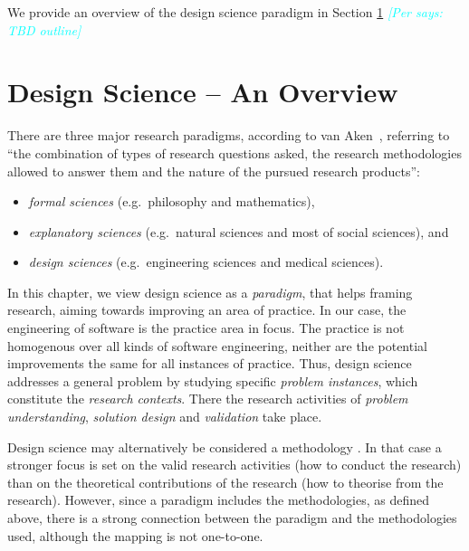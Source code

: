 \documentclass[graybox]{svmult}
\newcommand{\per}[1]{\textcolor{cyan}{{\it [Per says: #1]}}}
\newcommand{\per}[1]{}
\begin{document}
We provide an overview of the design science paradigm in Section \ref{sec:overview} \per{TBD outline}

\section{Design Science -- An Overview}
\label{sec:overview}


There are three major research paradigms, according to van Aken~\cite{van_aken_management_2004}, referring to ``the combination of types of research questions asked, the research methodologies allowed to answer them and the nature of the pursued research products'':
\begin{itemize}
\item \emph{formal sciences} (e.g.\ philosophy and mathematics), 
\item \emph{explanatory sciences} (e.g.\ natural sciences and most of social sciences), and 
\item \emph{design sciences} (e.g.\ engineering sciences and medical sciences).  
\end{itemize}

In this chapter, we view design science as a \emph{paradigm}, that helps framing research, aiming towards improving an area of practice. In our case, the engineering of software is the practice area in focus. The practice is not homogenous over all kinds of software engineering, neither are the potential improvements the same for all instances of practice. Thus, design science addresses a general problem by studying  specific \emph{problem instances}, which constitute the \emph{research contexts}.  There the research activities of \emph{problem understanding}, \emph{solution design} and \emph{validation} take place.

Design science may alternatively be considered a methodology \cite{Wohlin2015}. In that case a stronger focus is set on the valid research activities (how to conduct the research) than on the theoretical contributions of the research (how to theorise from the research). However, since a paradigm includes the methodologies, as defined above, there is a strong connection between the paradigm and the methodologies used, although the mapping is not one-to-one.
\end{document}
